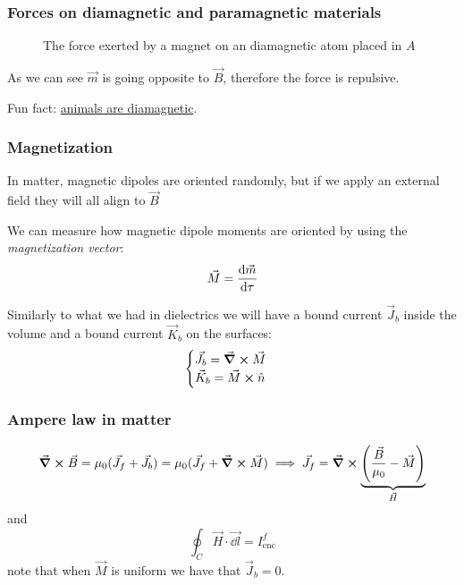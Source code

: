 \documentclass[12pt]{extarticle}
\begin{document}
\subsubsection{Forces on diamagnetic and paramagnetic materials}

\begin{figure}[H]
	\centering
	
	\caption{The force exerted by a magnet on an diamagnetic atom placed in $A$}
\end{figure}

As we can see $\vec m$ is going opposite to $\vec B$, therefore the force is repulsive.

Fun fact: \href{https://www.youtube.com/watch?v=KlJsVqc0ywM}{animals are diamagnetic}.

\subsubsection{Magnetization}

In matter, magnetic dipoles are oriented randomly,
but if we apply an external field they will all align to $\vec B$

We can measure how magnetic dipole moments are oriented by using the \emph{magnetization vector}:
\begin{equation}
	\vec M = \dv{\vec m}{\tau}
\end{equation}

Similarly to what we had in dielectrics we will have a bound current $\vec J_b$ inside the volume
and a bound current $\vec K_b$ on the surfaces:
\begin{equation}
	\begin{cases}
		\vec J_b = \curl \vec M \\
		\vec K_b = \vec M \cross \hat n
	\end{cases}
\end{equation}

\subsubsection{Ampere law in matter}
\begin{equation}
	\curl \vec B = \mu_0 (\vec J_f + \vec J_b) = \mu_0 (\vec J_f + \curl \vec M)
	\implies \vec J_f = \curl \underbrace{\left( \frac{\vec B}{\mu_0} - \vec M \right)}_{\vec H}
\end{equation}
and
\begin{equation}
	\oint_C \vec H \cdot \vec{\dd l} = I^f_\text{enc}
\end{equation}
note that when $\vec M$ is uniform we have that $\vec J_b = 0$.
\end{document}
